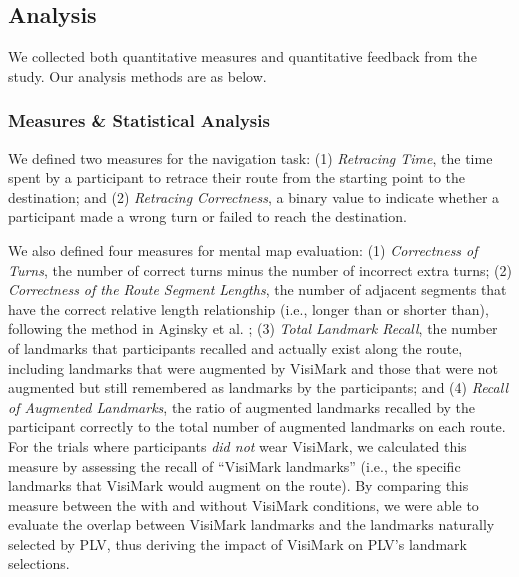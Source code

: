 

\subsection{Analysis}
We collected both quantitative measures and quantitative feedback from the study. Our analysis methods are as below.

\subsubsection{Measures \& Statistical Analysis}

We defined two measures for the navigation task: (1) \textit{Retracing Time}, the time spent by a participant to retrace their route from the starting point to the destination; and (2) \textit{Retracing Correctness}, a binary value to indicate whether a participant made a wrong turn or failed to reach the destination.

We also defined four measures for mental map evaluation: (1) \textit{Correctness of Turns}, the number of correct turns minus the number of incorrect extra turns; (2) \textit{Correctness of the Route Segment Lengths}, the number of adjacent segments that have the correct relative length relationship (i.e., longer than or shorter than), following the method in Aginsky et al. \cite{aginsky1997two}; (3) \textit{Total Landmark Recall}, the number of landmarks that participants recalled and actually exist along the route, including landmarks that were augmented by VisiMark and those that were not augmented but still remembered as landmarks by the participants; and (4) \textit{Recall of Augmented Landmarks}, the ratio of augmented landmarks recalled by the participant correctly to the total number of augmented landmarks on each route. For the trials where participants \textit{did not} wear VisiMark, we calculated this measure by assessing the recall of ``VisiMark landmarks'' (i.e., the specific landmarks that VisiMark would augment on the route). By comparing this measure between the with and without VisiMark conditions, we were able to evaluate the overlap between VisiMark landmarks and the landmarks naturally selected by PLV, thus deriving the impact of VisiMark on PLV's landmark selections.%

